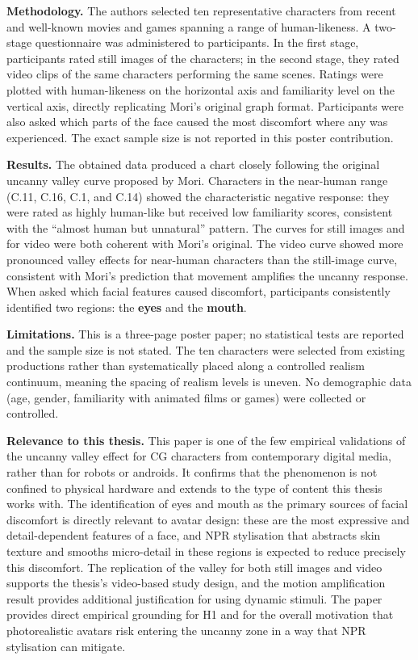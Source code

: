 \documentclass[11pt, a4paper]{article}
\begin{document}
\textbf{Methodology.} The authors selected ten representative characters from recent and well-known movies and games spanning a range of human-likeness. A two-stage questionnaire was administered to participants. In the first stage, participants rated still images of the characters; in the second stage, they rated video clips of the same characters performing the same scenes. Ratings were plotted with human-likeness on the horizontal axis and familiarity level on the vertical axis, directly replicating Mori's original graph format. Participants were also asked which parts of the face caused the most discomfort where any was experienced. The exact sample size is not reported in this poster contribution.

\textbf{Results.} The obtained data produced a chart closely following the original uncanny valley curve proposed by Mori. Characters in the near-human range (C.11, C.16, C.1, and C.14) showed the characteristic negative response: they were rated as highly human-like but received low familiarity scores, consistent with the ``almost human but unnatural'' pattern. The curves for still images and for video were both coherent with Mori's original. The video curve showed more pronounced valley effects for near-human characters than the still-image curve, consistent with Mori's prediction that movement amplifies the uncanny response. When asked which facial features caused discomfort, participants consistently identified two regions: the \textbf{eyes} and the \textbf{mouth}.

\textbf{Limitations.} This is a three-page poster paper; no statistical tests are reported and the sample size is not stated. The ten characters were selected from existing productions rather than systematically placed along a controlled realism continuum, meaning the spacing of realism levels is uneven. No demographic data (age, gender, familiarity with animated films or games) were collected or controlled.

\textbf{Relevance to this thesis.} This paper is one of the few empirical validations of the uncanny valley effect for CG characters from contemporary digital media, rather than for robots or androids. It confirms that the phenomenon is not confined to physical hardware and extends to the type of content this thesis works with. The identification of eyes and mouth as the primary sources of facial discomfort is directly relevant to avatar design: these are the most expressive and detail-dependent features of a face, and NPR stylisation that abstracts skin texture and smooths micro-detail in these regions is expected to reduce precisely this discomfort. The replication of the valley for both still images and video supports the thesis's video-based study design, and the motion amplification result provides additional justification for using dynamic stimuli. The paper provides direct empirical grounding for H1 and for the overall motivation that photorealistic avatars risk entering the uncanny zone in a way that NPR stylisation can mitigate.
\end{document}
